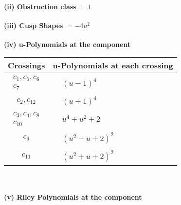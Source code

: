 \documentclass[1p]{elsarticle_modified}
\theoremstyle{definition}
\begin{document}
\flushleft \textbf{(ii) Obstruction class $= 1$}\\~\\
\flushleft \textbf{(iii) Cusp Shapes $= -4 u^2$}\\~\\
\newpage\renewcommand{\arraystretch}{1}
\flushleft \textbf{(iv) u-Polynomials at the component}\newline \\
\begin{tabular}{m{50pt}|m{274pt}}
Crossings & \hspace{64pt}u-Polynomials at each crossing \\
\hline $$\begin{aligned}c_{1},c_{5},c_{6}\\c_{7}\end{aligned}$$&$\begin{aligned}
&(u-1)^4
\end{aligned}$\\
\hline $$\begin{aligned}c_{2},c_{12}\end{aligned}$$&$\begin{aligned}
&(u+1)^4
\end{aligned}$\\
\hline $$\begin{aligned}c_{3},c_{4},c_{8}\\c_{10}\end{aligned}$$&$\begin{aligned}
&u^4+u^2+2
\end{aligned}$\\
\hline $$\begin{aligned}c_{9}\end{aligned}$$&$\begin{aligned}
&(u^2- u+2)^2
\end{aligned}$\\
\hline $$\begin{aligned}c_{11}\end{aligned}$$&$\begin{aligned}
&(u^2+u+2)^2
\end{aligned}$\\
\hline
\end{tabular}\\~\\
\newpage\renewcommand{\arraystretch}{1}
\flushleft \textbf{(v) Riley Polynomials at the component}\newline \\
\end{document}
